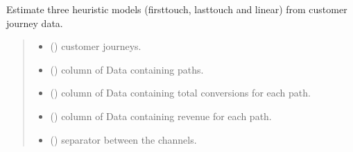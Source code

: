 \documentclass[letterpaper,10pt,english]{sphinxmanual}
\begin{document}

\begin{fulllineitems}
\label{\detokenize{index:ChannelAttribution.heuristic_models}}
\pysigstartsignatures
\pysiglinewithargsret
{}
{\sphinxparamcomma {}\sphinxparamcomma {}\sphinxparamcomma {}\sphinxparamcomma {}\sphinxparamcomma {}}
{}
\pysigstopsignatures
\sphinxAtStartPar
Estimate three heuristic models (first\sphinxhyphen{}touch, last\sphinxhyphen{}touch and linear) from customer journey data.
\begin{quote}\begin{description}
\begin{itemize}
\item {} 
\sphinxAtStartPar
{} () \textendash{} customer journeys.

\item {} 
\sphinxAtStartPar
{} () \textendash{} column of Data containing paths.

\item {} 
\sphinxAtStartPar
{} () \textendash{} column of Data containing total conversions for each path.

\item {} 
\sphinxAtStartPar
{} (\sphinxstyleliteralemphasis{\sphinxupquote{, }}\sphinxstyleliteralemphasis{\sphinxupquote{, }}) \textendash{} column of Data containing revenue for each path.

\item {} 
\sphinxAtStartPar
{} (\sphinxstyleliteralemphasis{\sphinxupquote{, }}) \textendash{} separator between the channels.


\end{itemize}
\end{description}
\end{quote}
\end{fulllineitems}
\end{document}
